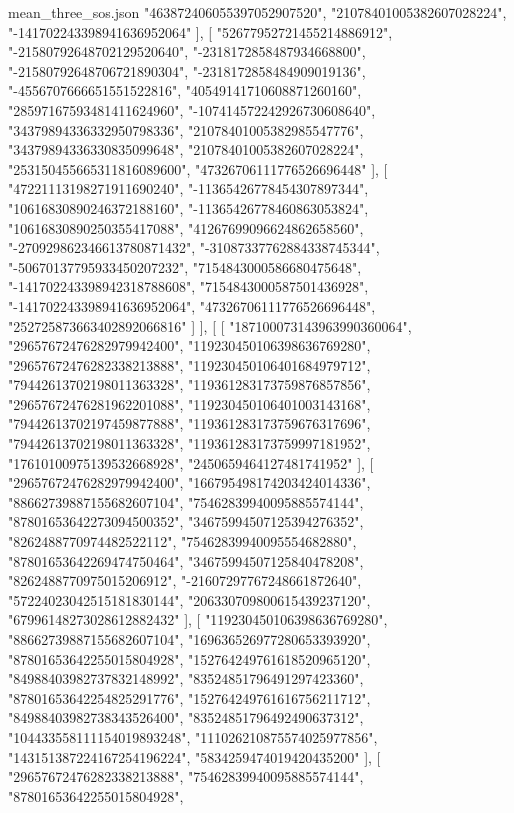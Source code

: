 \begin{filecontents*}[overwrite]{mean_three_sos.json}
    "463872406055397052907520",
    "21078401005382607028224",
    "-141702243398941636952064"
   ],
   [
    "52677952721455214886912",
    "-21580792648702129520640",
    "-2318172858487934668800",
    "-21580792648706721890304",
    "-2318172858484909019136",
    "-4556707666651551522816",
    "40549141710608871260160",
    "28597167593481411624960",
    "-107414572242926730608640",
    "34379894336332950798336",
    "21078401005382985547776",
    "34379894336330835099648",
    "21078401005382607028224",
    "253150455665311816089600",
    "47326706111776526696448"
   ],
   [
    "47221113198271911690240",
    "-11365426778454307897344",
    "10616830890246372188160",
    "-11365426778460863053824",
    "10616830890250355417088",
    "41267699096624862658560",
    "-270929862346613780871432",
    "-31087337762884338745344",
    "-50670137795933450207232",
    "7154843000586680475648",
    "-141702243398942318788608",
    "7154843000587501436928",
    "-141702243398941636952064",
    "47326706111776526696448",
    "252725873663402892066816"
   ]
  ],
  [
   [
    "187100073143963990360064",
    "29657672476282979942400",
    "119230450106398636769280",
    "29657672476282338213888",
    "119230450106401684979712",
    "79442613702198011363328",
    "119361283173759876857856",
    "29657672476281962201088",
    "119230450106401003143168",
    "79442613702197459877888",
    "119361283173759676317696",
    "79442613702198011363328",
    "119361283173759997181952",
    "17610100975139532668928",
    "2450659464127481741952"
   ],
   [
    "29657672476282979942400",
    "166795498174203424014336",
    "88662739887155682607104",
    "75462839940095885574144",
    "87801653642273094500352",
    "34675994507125394276352",
    "8262488770974482522112",
    "75462839940095554682880",
    "87801653642269474750464",
    "34675994507125840478208",
    "8262488770975015206912",
    "-21607297767248661872640",
    "57224023042515181830144",
    "206330709800615439237120",
    "67996148273028612882432"
   ],
   [
    "119230450106398636769280",
    "88662739887155682607104",
    "169636526977280653393920",
    "87801653642255015804928",
    "152764249761618520965120",
    "84988403982737832148992",
    "83524851796491297423360",
    "87801653642254825291776",
    "152764249761616756211712",
    "84988403982738343526400",
    "83524851796492490637312",
    "104433558111154019893248",
    "111026210875574025977856",
    "143151387224167254196224",
    "5834259474019420435200"
   ],
   [
    "29657672476282338213888",
    "75462839940095885574144",
    "87801653642255015804928",

\end{filecontents*}

